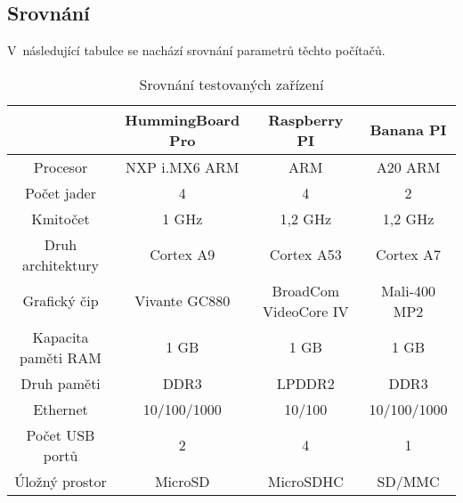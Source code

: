 \newpage
\subsection{Srovnání}
V~následující tabulce se nachází srovnání parametrů těchto počítačů.
\begin{table}[H]
\centering
\caption{Srovnání testovaných zařízení}
\begin{tabular} { |c|c|c|c| }
\hline
{}                  & {HummingBoard Pro}   & {Raspberry PI}        & {Banana PI}          \\ \hline
Procesor            & NXP i.MX6 ARM         & ARM                   & A20 ARM              \\ \hline
Počet jader         & 4                     & 4                     & 2                    \\ \hline
Kmitočet            & 1 GHz                 & 1,2 GHz               & 1,2 GHz              \\ \hline
Druh architektury   & Cortex A9             & Cortex A53            & Cortex A7            \\ \hline
Grafický čip      & Vivante GC880           & BroadCom VideoCore IV & Mali-400 MP2         \\ \hline
Kapacita paměti RAM & 1 GB                  & 1 GB                  & 1 GB                 \\ \hline
Druh paměti         & DDR3                  & LPDDR2                & DDR3                 \\ \hline
Ethernet            & 10/100/1000           & 10/100                & 10/100/1000          \\ \hline
Počet USB portů     & 2                     & 4                     & 1                    \\ \hline
Úložný prostor      & MicroSD               & MicroSDHC             & SD/MMC               \\ \hline
\end{tabular}
\label{srovnaniPC}
\end{table}
